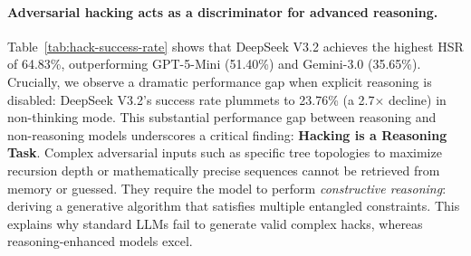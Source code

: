 \documentclass[11pt]{article}
\begin{document}
\paragraph{Adversarial hacking acts as a discriminator for advanced reasoning.}
Table~\ref{tab:hack-success-rate} shows that DeepSeek V3.2 achieves the highest HSR of 64.83\%, outperforming GPT-5-Mini (51.40\%) and Gemini-3.0 (35.65\%). Crucially, we observe a dramatic performance gap when explicit reasoning is disabled: DeepSeek V3.2's success rate plummets to 23.76\% (a 2.7$\times$ decline) in non-thinking mode. This substantial performance gap between reasoning and non-reasoning models underscores a critical finding: \textbf{Hacking is a Reasoning Task}. 
Complex adversarial inputs such as specific tree topologies to maximize recursion depth or mathematically precise sequences cannot be retrieved from memory or guessed. 
They require the model to perform \textit{constructive reasoning}: deriving a generative algorithm that satisfies multiple entangled constraints. 
This explains why standard LLMs fail to generate valid complex hacks, whereas reasoning-enhanced models excel.

\begin{table}[]
\centering
{}
\caption{Hack performance across different models. \textbf{HSR}: Hack Success Rate. \textbf{Avg. \#T}: The average number of refinement turns required to successfully hack a submission by directly LLM generated (lower is better, max 5). The symbol * indicates non-thinking mode for hybrid-reasoning models.}
\label{tab:hack-success-rate}
\vspace{-0.5cm}
\end{table}
\end{document}
